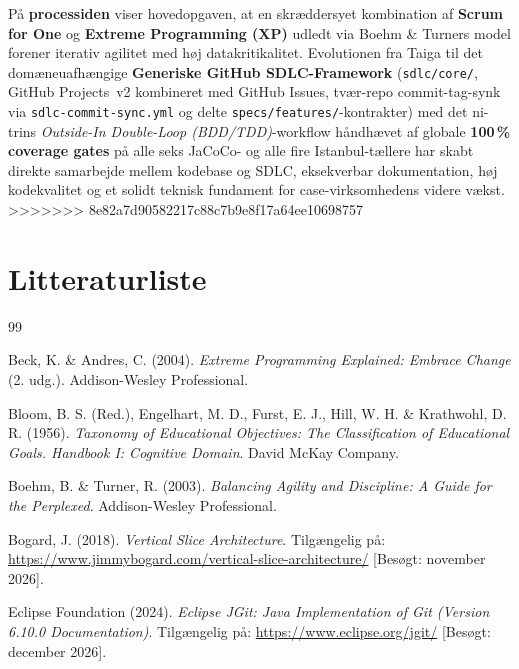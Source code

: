 \documentclass[11pt,a4paper]{article}
\begin{document}
\begin{table}[htbp]
\begin{table}[htbp]
På \textbf{processiden} viser hovedopgaven, at en skræddersyet kombination af \textbf{Scrum for One} \cite{schwaber2020} og \textbf{Extreme Programming (XP)} \cite{beck2004} udledt via Boehm \& Turners model \cite{boehm2003} forener iterativ agilitet med høj datakritikalitet. Evolutionen fra Taiga til det domæneuafhængige \textbf{Generiske GitHub SDLC-Framework} (\texttt{sdlc/core/}, GitHub Projects~v2 kombineret med GitHub Issues, tvær-repo commit-tag-synk via \texttt{sdlc-commit-sync.yml} og delte \texttt{specs/features/}-kontrakter) med det ni-trins \textit{Outside-In Double-Loop (BDD/TDD)}-workflow håndhævet af globale \textbf{100\,\% coverage gates} på alle seks JaCoCo- og alle fire Istanbul-tællere har skabt direkte samarbejde mellem kodebase og SDLC, eksekverbar dokumentation, høj kodekvalitet og et solidt teknisk fundament for case-virksomhedens videre vækst.
>>>>>>> 8e82a7d90582217c88c7b9e8f17a64ee10698757

\newpage
\section{Litteraturliste}

\begin{thebibliography}{99}

Beck, K. \& Andres, C. (2004). \textit{Extreme Programming Explained: Embrace Change} (2. udg.). Addison-Wesley Professional.

Bloom, B. S. (Red.), Engelhart, M. D., Furst, E. J., Hill, W. H. \& Krathwohl, D. R. (1956). \textit{Taxonomy of Educational Objectives: The Classification of Educational Goals. Handbook I: Cognitive Domain}. David McKay Company.

Boehm, B. \& Turner, R. (2003). \textit{Balancing Agility and Discipline: A Guide for the Perplexed}. Addison-Wesley Professional.

Bogard, J. (2018). \textit{Vertical Slice Architecture}. Tilgængelig på: \url{https://www.jimmybogard.com/vertical-slice-architecture/} [Besøgt: november 2026].

Eclipse Foundation (2024). \textit{Eclipse JGit: Java Implementation of Git (Version 6.10.0 Documentation)}. Tilgængelig på: \url{https://www.eclipse.org/jgit/} [Besøgt: december 2026].


\end{thebibliography}
\end{table}
\end{table}
\end{document}
